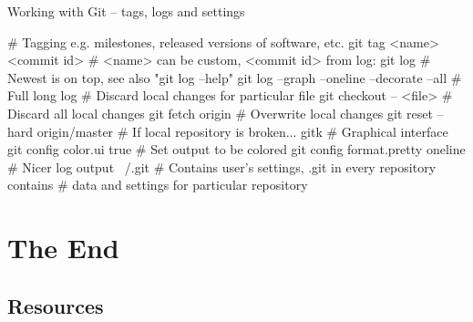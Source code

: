 \documentclass[compress, ucs, xelatex, 11pt, xcolor=svgnames,
  hyperref={
    bookmarks=true,
    unicode=true,
    colorlinks=true,
    pdftitle={Linux, command line and MetaCentrum},
    plainpages=false,
    pdfauthor={Vojtech Zeisek},
    pdfsubject={Course about use of Linux command line, writing shell scripts and using MetaCentrum of CESNET},
    pdfcreator={XeLaTeX},
    pdfkeywords={Linux, GNU, BASH, shell, command line, MetaCentrum},
    linkcolor=DarkRed,
    anchorcolor=DarkBlue,
    citecolor=Indigo,
    filecolor=NavyBlue,
    menucolor=DarkMagenta,
    urlcolor=DarkBlue,
    pdftex},
  url={hyphens, lowtilde} %
  ]{beamer}
\begin{document}
\begin{frame}[fragile]{Working with Git -- tags, logs and settings}
  \begin{bashcode}
    # Tagging e.g. milestones, released versions of software, etc.
    git tag <name> <commit id> # <name> can be custom, <commit id> from log:
    git log # Newest is on top, see also "git log --help"
    git log --graph --oneline --decorate --all # Full long log
    # Discard local changes for particular file
    git checkout -- <file>
    # Discard all local changes
    git fetch origin # Overwrite local changes
    git reset --hard origin/master # If local repository is broken...
    gitk # Graphical interface
    git config color.ui true # Set output to be colored
    git config format.pretty oneline # Nicer log output
    ~/.git # Contains user's settings, .git in every repository contains
           # data and settings for particular repository
  \end{bashcode}
\end{frame}

\section{The End}



\subsection{Resources}
\end{document}
